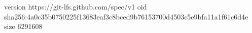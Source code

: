 version https://git-lfs.github.com/spec/v1
oid sha256:4a0c35b0750225f13683eaf3c8bced9b76153700d4503c5e9bfa11a1f61c6d4e
size 6291608
